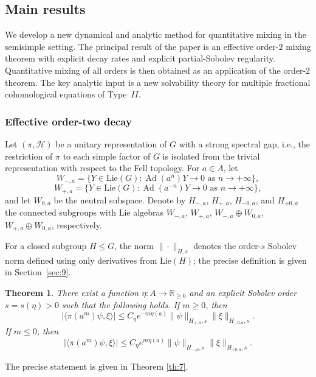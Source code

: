 \documentclass[11 pt]{amsart}
\newtheorem{theorem}{Theorem}[section]
\theoremstyle{definition}
\numberwithin{equation}{section}
\def\Lie{\mathrm{Lie}}
\begin{document}
\subsection{Main results} We develop a new dynamical and analytic method for quantitative mixing in the semisimple setting. The principal result of the paper is an effective order-$2$ mixing theorem with explicit decay rates and explicit partial-Sobolev regularity. Quantitative mixing of all orders is then obtained as an application of the order-$2$ theorem. The key analytic input is a new solvability theory for multiple fractional cohomological equations of Type~$II$.







\subsubsection{Effective order-two decay} Let $(\pi, \mathcal{H})$ be a unitary representation of $G$ with a strong spectral gap, i.e., the restriction of $\pi$ to each simple factor of $G$ is isolated
from the trivial representation with respect to the Fell topology. For \(a\in A\), let
\[
W_{-,a}=\{Y\in\text{Lie}(G):\operatorname{Ad}(a^n)Y\to0
\text{ as }n\to+\infty\},
\]
\[
W_{+,a}=\{Y\in\text{Lie}(G):\operatorname{Ad}(a^{-n})Y\to0
\text{ as }n\to+\infty\},
\]
and let \(W_{0,a}\) be the neutral subspace.  Denote by
\(H_{-,a}\), \(H_{+,a}\), \(H_{-0,a}\), and \(H_{+0,a}\) the connected
subgroups with Lie algebras $W_{-,a}$, $W_{+,a}$, $W_{-,a}\oplus W_{0,a}$,
$W_{+,a}\oplus W_{0,a}$,
respectively.

For a closed subgroup \(H\leq G\), the norm
\(\|\cdot\|_{H,s}\) denotes the order-\(s\) Sobolev norm defined using
only derivatives from \(\Lie(H)\); the precise definition is given in
Section~\ref{sec:9}.
\begin{theorem}\label{th:4}
There exist a function \(\eta:A\to\mathbb R_{\ge0}\) and an explicit Sobolev order \(s=s(\eta)>0\)
such that the following holds.
If \(m\geq0\), then
\[
|\langle \pi(a^m)\psi,\xi\rangle|
\leq
C_\eta e^{-m\eta(a)}
\|\psi\|_{H_{+,a},s}\|\xi\|_{H_{-0,a},s}.
\]
If \(m\leq0\), then
\[
|\langle \pi(a^m)\psi,\xi\rangle|
\leq
C_\eta e^{m\eta(a)}
\|\psi\|_{H_{-,a},s}\|\xi\|_{H_{+0,a},s}.
\]
\end{theorem}
The precise statement is given in Theorem \ref{th:7}.
\end{document}
